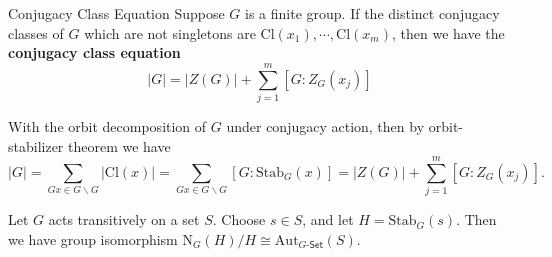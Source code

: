 \begin{proposition}{Conjugacy Class Equation}{}
    Suppose $G$ is a finite group. If the distinct conjugacy classes of $G$ which are not singletons are $\mathrm{Cl}(x_1),\cdots,\mathrm{Cl}(x_m)$, then we have the \textbf{conjugacy class equation}
    \[
        |G|=|Z(G)|+\sum_{j=1}^m\left[G: Z_G\left(x_j\right)\right]
    \]
\end{proposition}
\begin{prf}
    With the orbit decomposition of $G$ under conjugacy action, then by orbit-stabilizer theorem we have
    \[
        |G|=\sum_{Gx\in G\backslash G}\left|\mathrm{Cl}(x)\right|=\sum_{Gx\in G\backslash G}\left[G: \mathrm{Stab}_G(x)\right]=|Z(G)|+\sum_{j=1}^m\left[G: Z_G\left(x_j\right)\right].
    \]
\end{prf}

\begin{proposition}{}{}
    Let $G$ acts transitively on a set $S$. Choose $s \in S$, and let $H = \mathrm{Stab}_G(s)$. Then we have group isomorphism $\mathrm{N}_G(H)/H\cong \mathrm{Aut}_{G\text{-}\mathsf{Set}}(S)$.
\end{proposition}

